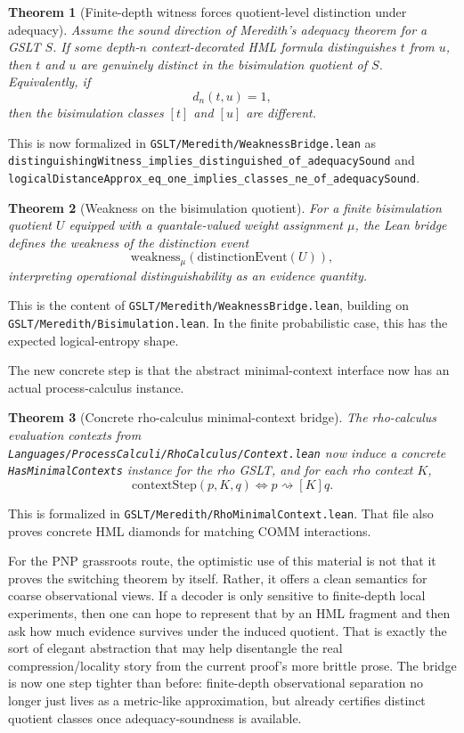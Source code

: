 \documentclass[11pt]{article}
\newtheorem{theorem}{Theorem}[section]
\theoremstyle{remark}
\begin{document}
\begin{theorem}[Finite-depth witness forces quotient-level distinction under adequacy]
Assume the sound direction of Meredith's adequacy theorem for a GSLT \(S\).  If
some depth-\(n\) context-decorated HML formula distinguishes \(t\) from \(u\),
then \(t\) and \(u\) are genuinely distinct in the bisimulation quotient of
\(S\).  Equivalently, if
\[
  d_n(t,u) = 1,
\]
then the bisimulation classes \([t]\) and \([u]\) are different.
\end{theorem}

\noindent
This is now formalized in \texttt{GSLT/Meredith/WeaknessBridge.lean} as
\texttt{distinguishingWitness\_implies\_distinguished\_of\_adequacySound} and
\texttt{logicalDistanceApprox\_eq\_one\_implies\_classes\_ne\_of\_adequacySound}.

\begin{theorem}[Weakness on the bisimulation quotient]
For a finite bisimulation quotient \(U\) equipped with a quantale-valued weight
assignment \(\mu\), the Lean bridge defines the weakness of the distinction event
\[
  \mathrm{weakness}_{\mu}(\mathrm{distinctionEvent}(U)),
\]
interpreting operational distinguishability as an evidence quantity.
\end{theorem}

\noindent
This is the content of \texttt{GSLT/Meredith/WeaknessBridge.lean}, building on
\texttt{GSLT/Meredith/Bisimulation.lean}.  In the finite probabilistic case, this
has the expected logical-entropy shape.

The new concrete step is that the abstract minimal-context interface now has an
actual process-calculus instance.

\begin{theorem}[Concrete rho-calculus minimal-context bridge]
The rho-calculus evaluation contexts from
\texttt{Languages/ProcessCalculi/RhoCalculus/Context.lean} now induce a concrete
\texttt{HasMinimalContexts} instance for the rho GSLT, and for each rho context
\(K\),
\[
  \mathrm{contextStep}(p,K,q)
  \iff
  p \mathrel{\rightsquigarrow[K]} q.
\]
\end{theorem}

\noindent
This is formalized in \texttt{GSLT/Meredith/RhoMinimalContext.lean}.  That file
also proves concrete HML diamonds for matching COMM interactions.

For the PNP grassroots route, the optimistic use of this material is not that it
proves the switching theorem by itself.  Rather, it offers a clean semantics for
coarse observational views.  If a decoder is only sensitive to finite-depth local
experiments, then one can hope to represent that by an HML fragment and then ask
how much evidence survives under the induced quotient.  That is exactly the sort
of elegant abstraction that may help disentangle the real compression/locality
story from the current proof's more brittle prose.  The bridge is now one step
tighter than before: finite-depth observational separation no longer just lives
as a metric-like approximation, but already certifies distinct quotient classes
once adequacy-soundness is available.
\end{document}
